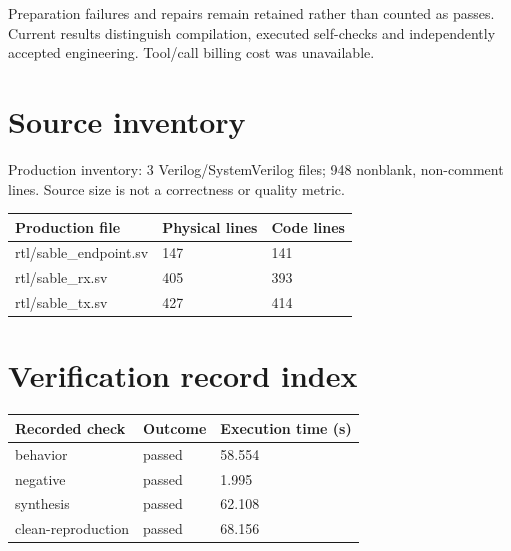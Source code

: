 \documentclass[11pt,a4paper]{article}
\begin{document}
Preparation failures and repairs remain retained rather than counted as passes. Current results distinguish compilation,\allowbreak{} executed self-checks and independently accepted engineering. Tool/\allowbreak{}call billing cost was unavailable.


\appendix\section{Source inventory}

Production inventory: 3 Verilog/\allowbreak{}SystemVerilog files; 948 nonblank,\allowbreak{} non-comment lines. Source size is not a correctness or quality metric.

{\small\begin{longtable}{@{}L{0.61\textwidth}L{0.15\textwidth}L{0.15\textwidth}@{}}\toprule

\textbf{Production file} & \textbf{Physical lines} & \textbf{Code lines}\\\midrule\endhead

rtl/\allowbreak{}sable\_\allowbreak{}endpoint.sv & 147 & 141\\[3pt]

rtl/\allowbreak{}sable\_\allowbreak{}rx.sv & 405 & 393\\[3pt]

rtl/\allowbreak{}sable\_\allowbreak{}tx.sv & 427 & 414\\[3pt]

\bottomrule\end{longtable}}

\section{Verification record index}

{\small\begin{longtable}{@{}L{0.57\textwidth}L{0.16\textwidth}L{0.17\textwidth}@{}}\toprule

\textbf{Recorded check} & \textbf{Outcome} & \textbf{Execution time (\allowbreak{}s)\allowbreak{}}\\\midrule\endhead

behavior & passed & 58.554\\[3pt]

negative & passed & 1.995\\[3pt]

synthesis & passed & 62.108\\[3pt]

clean-reproduction & passed & 68.156\\[3pt]

\bottomrule\end{longtable}}
\end{document}
